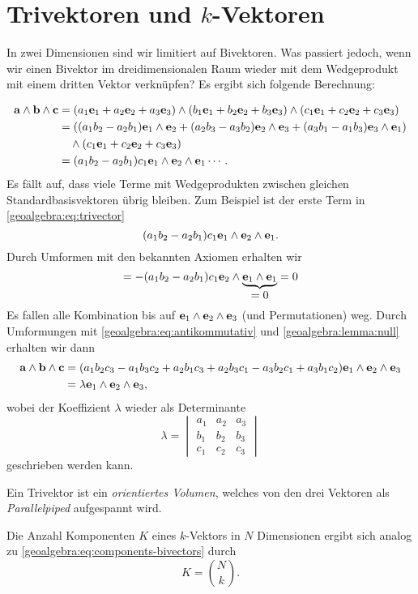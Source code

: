 \section{Trivektoren und $k$-Vektoren}
\label{geoalgebra:section:trivectors-n-vectors}
In zwei Dimensionen sind wir limitiert auf Bivektoren. Was passiert jedoch, wenn wir einen Bivektor
im dreidimensionalen Raum wieder mit dem Wedgeprodukt mit einem dritten Vektor verknüpfen?
Es ergibt sich folgende Berechnung:
{
\begin{align} 
\mathbf{a} \wedge \mathbf{b} \wedge \mathbf{c}
&=
(a_1 \mathbf{e}_1 + a_2 \mathbf{e}_2 + a_3 \mathbf{e}_3) \wedge (b_1 \mathbf{e}_1 + b_2 \mathbf{e}_2 + b_3 \mathbf{e}_3) \wedge (c_1 \mathbf{e}_1 + c_2 \mathbf{e}_2 + c_3 \mathbf{e}_3)
\notag
\\
&=
((a_1 b_2 - a_2 b_1) \mathbf{e}_1 \wedge \mathbf{e}_2 +(a_2 b_3 - a_3 b_2) \mathbf{e}_2 \wedge \mathbf{e}_3 +(a_3 b_1 - a_1 b_3) \mathbf{e}_3 \wedge \mathbf{e}_1)
\notag
\\
&\quad\wedge (c_1 \mathbf{e}_1 + c_2 \mathbf{e}_2 + c_3 \mathbf{e}_3)
\notag
\\
&=
(a_1 b_2 - a_2 b_1) c_1 \mathbf{e}_1 \wedge \mathbf{e}_2 \wedge \mathbf{e}_1 \cdots.
\label{geoalgebra:eq:trivector}
\end{align}
Es fällt auf, dass viele Terme mit Wedgeprodukten zwischen gleichen Standardbasisvektoren übrig bleiben. Zum Beispiel ist der erste Term in \eqref{geoalgebra:eq:trivector}
\begin{equation*}
(a_1 b_2 - a_2 b_1) c_1 \mathbf{e}_1 \wedge \mathbf{e}_2 \wedge \mathbf{e}_1.
\end{equation*}
Durch Umformen mit den bekannten Axiomen erhalten wir
\begin{equation*}
=-(a_1 b_2 - a_2 b_1) c_1 \mathbf{e}_2 \wedge \underbrace{\mathbf{e}_1 \wedge \mathbf{e}_1}_{\displaystyle =0} = 0
\end{equation*}
Es fallen alle Kombination bis auf $\mathbf{e}_1 \wedge \mathbf{e}_2 \wedge \mathbf{e}_3$ (und Permutationen) weg.
Durch Umformungen mit \eqref{geoalgebra:eq:antikommutativ} und
\eqref{geoalgebra:lemma:null} erhalten wir dann
\begin{align*}
  \mathbf{a} \wedge \mathbf{b} \wedge \mathbf{c} &= (a_1 b_2 c_3 - a_1 b_3 c_2 + a_2 b_1 c_3 + a_2 b_3 c_1 - a_3 b_2 c_1 + a_3 b_1 c_2) \mathbf{e}_1 \wedge \mathbf{e}_2 \wedge \mathbf{e}_3 \\
  &= \lambda \mathbf{e}_1 \wedge \mathbf{e}_2 \wedge \mathbf{e}_3,
\end{align*}
wobei der Koeffizient $\lambda$ wieder als Determinante
%
\begin{equation*}
\lambda = \begin{vmatrix} a_1 & a_2 & a_3 \\ b_1 & b_2 & b_3 \\ c_1 & c_2 & c_3 \end{vmatrix}
\end{equation*}
geschrieben werden kann.

Ein Trivektor ist ein \emph{orientiertes Volumen}, welches von den drei Vektoren als \emph{Parallelpiped} aufgespannt wird.
%
%
%

Die Anzahl Komponenten $K$ eines $k$-Vektors in $N$ Dimensionen ergibt sich analog zu \eqref{geoalgebra:eq:components-bivectors} durch
\begin{equation*}
  K = \binom{N}{k}.
\end{equation*}
}
